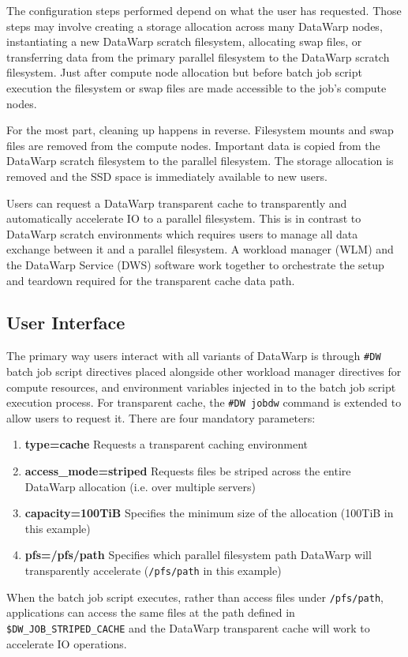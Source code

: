 \documentclass[10pt, conference, compsocconf]{IEEEtran}
\begin{document}
The configuration steps performed depend on what the user has requested.  Those steps may involve creating a storage allocation across many DataWarp nodes, instantiating a new DataWarp scratch filesystem, allocating swap files, or transferring data from the primary parallel filesystem to the DataWarp scratch filesystem.  Just after compute node allocation but before batch job script execution the filesystem or swap files are made accessible to the job's compute nodes.

For the most part, cleaning up happens in reverse.  Filesystem mounts and swap files are removed from the compute nodes.  Important data is copied from the DataWarp scratch filesystem to the parallel filesystem.  The storage allocation is removed and the SSD space is immediately available to new users.

Users can request a DataWarp transparent cache to transparently and automatically accelerate IO to a parallel filesystem.  This is in contrast to DataWarp scratch environments which requires users to manage all data exchange between it and a parallel filesystem.  A workload manager (WLM) and the DataWarp Service (DWS) software work together to orchestrate the setup and teardown required for the transparent cache data path.

\subsection{User Interface}

The primary way users interact with all variants of DataWarp is through \texttt{\#DW} batch job script directives placed alongside other workload manager directives for compute resources, and environment variables injected in to the batch job script execution process.  For transparent cache, the \texttt{\#DW~jobdw} command is extended to allow users to request it.  There are four mandatory parameters:
\begin{enumerate}
\item \textbf{type=cache} Requests a transparent caching environment
\item \textbf{access\_mode=striped} Requests files be striped across the entire DataWarp allocation (i.e. over multiple servers)
\item \textbf{capacity=100TiB} Specifies the minimum size of the allocation (100TiB in this example)
\item \textbf{pfs=/pfs/path} Specifies which parallel filesystem path DataWarp will transparently accelerate (\texttt{/pfs/path} in this example)
\end{enumerate}
When the batch job script executes, rather than access files under \texttt{/pfs/path}, applications can access the same files at the path defined in \texttt{\$DW\_JOB\_STRIPED\_CACHE} and the DataWarp transparent cache will work to accelerate IO operations.
\end{document}
